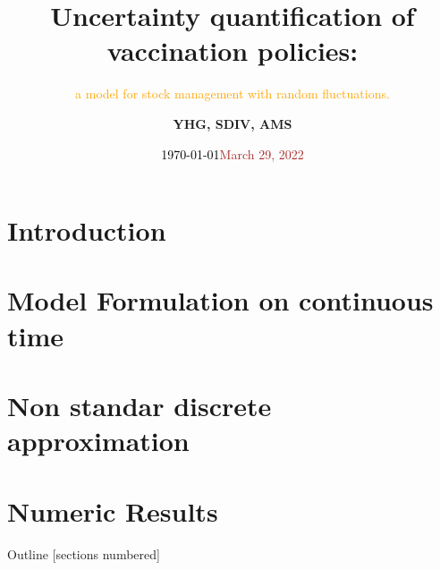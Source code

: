 \documentclass[texcoord,
    10pt]{beamer}
\title{Uncertainty quantification of vaccination policies:
}%
\subtitle{%
        \textcolor{orange}{%
            a model for stock management with random fluctuations.
        }
    }
\date{\textcolor{black}{\today}}
\date{\textcolor{brown}{March 29, 2022}}
\author{\bf
        YHG, SDIV, AMS
    }
\institute{
        \textcolor{verde}{
            UNACH,
            CONACYT-Universidad de Sonora,
            Universidad de Sonora
        }
    }
\begin{document}
    \maketitle
     \section*{Introduction}
         
     \section{Model Formulation on continuous time}
         
     \section{Non standar discrete approximation}
         
     \section{Numeric Results}
        
     \begin{frame}{Outline}
         \hypersetup{linkcolor=black}
         [sections numbered]
         \tableofcontents
     \end{frame}
\end{document}
